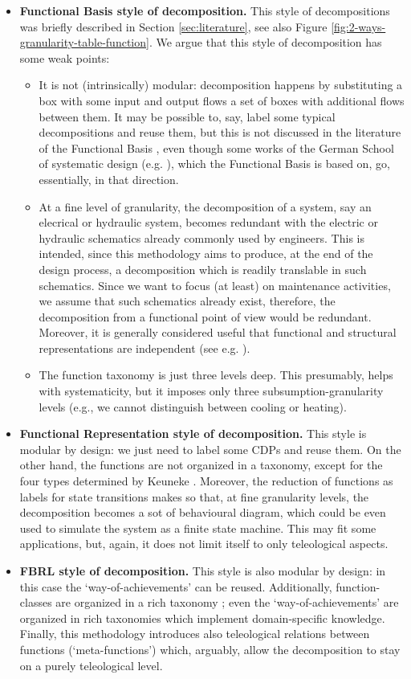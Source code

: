 \documentclass[
]{ceurart}
\begin{document}
\begin{itemize}
  \item \textbf{Functional Basis style of decomposition.} This style of decompositions was briefly described in Section \ref{sec:literature}, see also Figure \ref{fig:2-ways-granularity-table-function}. We argue that this style of decomposition has some weak points:
  \begin{itemize}
    \item It is not (intrinsically) modular: decomposition happens by substituting a box with some input and output flows a set of boxes with additional flows between them. It may be possible to, say, label some typical decompositions and reuse them, but this is not discussed in the literature of the Functional Basis , even though some works of the German School of systematic design (e.g. \cite{rothKonstruierenMitKonstruktionskatalogen2000}), which the Functional Basis is based on, go, essentially, in that direction. 
    \item At a fine level of granularity, the decomposition of a system, say an elecrical or hydraulic system, becomes redundant with the electric or hydraulic schematics already commonly used by engineers. This is intended, since this methodology aims to produce, at the end of the design process, a decomposition which is readily translable in such schematics. Since we want to focus (at least) on maintenance activities, we assume that such schematics already exist, therefore, the decomposition from a functional point of view would be redundant. Moreover, it is generally considered useful that functional and structural representations are independent (see e.g. \cite{ISOIEC8134612009}).
    \item The function taxonomy is just three levels deep. This presumably, helps with systematicity, but it imposes only three subsumption-granularity levels (e.g., we cannot distinguish between cooling or heating).
  \end{itemize}
  \item \textbf{Functional Representation style of decomposition.} This style is modular by design: we just need to label some CDPs and reuse them. On the other hand, the functions are not organized in a taxonomy, except for the four types determined by Keuneke \cite{keuneke_device_1991}. Moreover, the reduction of functions as labels for state transitions makes so that, at fine granularity levels, the decomposition becomes a sot of behavioural diagram, which could be even used to simulate the system as a finite state machine. This may fit some applications, but, again, it does not limit itself to only teleological aspects.
  \item \textbf{FBRL style of decomposition.} This style is also modular by design: in this case the `way-of-achievements' can be reused. Additionally, function-classes are organized in a rich taxonomy ; even the `way-of-achievements' are organized in rich taxonomies which implement domain-specific knowledge. Finally, this methodology introduces also teleological relations between functions (`meta-functions') which, arguably, allow the decomposition to stay on a purely teleological level. 
\end{itemize}
\end{document}
